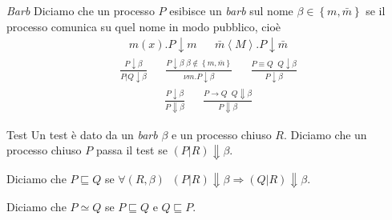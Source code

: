 \documentclass{beamer}
\theoremstyle{plain}
\theoremstyle{definition}
\theoremstyle{remark}
\newcommand{\set}[1]{\left\{#1\right\}}
\newcommand{\ang}[1]{\left<#1\right>}
\begin{document}
\begin{frame}{\textit{Barb}}
  Diciamo che un processo $P$ esibisce un \textit{barb} sul nome
  $\beta \in \set{m,\bar m}$ se il processo comunica su quel nome in
  modo pubblico, cioè
  \begin{align*}
    m(x).P \downarrow m & & \bar m \ang{M}.P \downarrow \bar m 
  \end{align*}
  \begin{align*}
    \frac{P\downarrow \beta}{ P|Q \downarrow \beta} & &
                                                        \frac{P\downarrow
                                                        \beta\; \beta
                                                      \not\in \set{m,
                                                      \bar m}}{ \nu
                                                      m. P \downarrow
                                                      \beta} & & \frac{
                                                               P
                                                               \equiv
                                                               Q \;\; Q
                                                               \downarrow
                                                               \beta}
                                                               {
                                                               P\downarrow
                                                               \beta}
  \end{align*}
  \begin{align*}
    \frac{P\downarrow \beta}{P\Downarrow \beta} & & \frac{P\rightarrow
                                                    Q\;\; Q \Downarrow
                                                    \beta }{P
                                                    \Downarrow \beta}
  \end{align*}
\end{frame}

\begin{frame}{Test}
  Un test è dato da un \textit{barb} $\beta$ e un processo chiuso
  $R$. Diciamo che un processo chiuso $P$ passa il test se $(P|R)
  \Downarrow \beta$.
  \vfill

  Diciamo che $P \sqsubseteq Q$ se  $\forall (R,\beta)\;\; (P|R)\Downarrow \beta \Rightarrow
  (Q|R)\Downarrow \beta$.

  Diciamo che $P \simeq Q$ se $P \sqsubseteq Q$ e $Q \sqsubseteq P$.
\end{frame}
\end{document}
